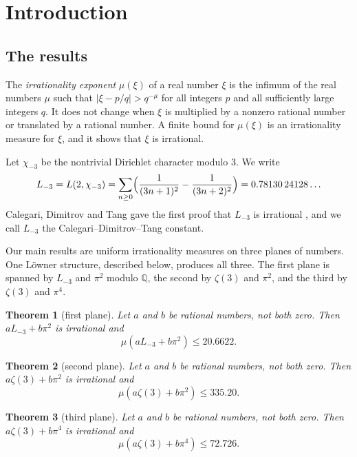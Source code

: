 \documentclass[11pt]{amsart}
\newtheorem{theorem}{Theorem}[section]
\theoremstyle{definition}
\theoremstyle{remark}
\numberwithin{equation}{section}
\newcommand{\Q}{\mathbb Q}
\newcommand{\Lt}{L_{-3}}             %
\newcommand{\MuPlaneA}{20.6622}
\newcommand{\MuPlaneB}{335.20}
\newcommand{\MuPlaneC}{72.726}
\begin{document}
\maketitle
\tableofcontents

\section{Introduction}\label{sec:intro}

\subsection{The results}
The \emph{irrationality exponent} $\mu(\xi)$ of a real number $\xi$ is the infimum of the real numbers $\mu$ such that
$|\xi-p/q|>q^{-\mu}$ for all integers $p$ and all sufficiently large integers $q$. It does not change when $\xi$ is multiplied by a nonzero rational number or translated by a rational
number. A finite bound for $\mu(\xi)$ is an irrationality measure for $\xi$, and it shows that $\xi$ is irrational.

Let $\chi_{-3}$ be the nontrivial Dirichlet character modulo $3$. We write
\[
 \Lt=L(2,\chi_{-3})=\sum_{n\ge0}\Bigl(\frac1{(3n+1)^2}-\frac1{(3n+2)^2}\Bigr)=0.78130\,24128\ldots
\]
Calegari, Dimitrov and Tang gave the first proof that $\Lt$ is irrational \cite{CDT2024}, and we call $\Lt$ the
Calegari--Dimitrov--Tang constant.

Our main results are uniform irrationality measures on three planes of numbers. One L\"owner structure, described
below, produces all three. The first plane is spanned by $\Lt$ and $\pi^2$ modulo $\Q$, the second by $\zeta(3)$ and
$\pi^2$, and the third by $\zeta(3)$ and $\pi^4$.

\begin{theorem}[first plane]\label{thm:plane1}
Let $a$ and $b$ be rational numbers, not both zero. Then $a\Lt+b\pi^2$ is irrational and
\[
 \mu(a\Lt+b\pi^2)\le\MuPlaneA .
\]
\end{theorem}

\begin{theorem}[second plane]\label{thm:plane2}
Let $a$ and $b$ be rational numbers, not both zero. Then $a\zeta(3)+b\pi^2$ is irrational and
\[
 \mu(a\zeta(3)+b\pi^2)\le\MuPlaneB .
\]
\end{theorem}

\begin{theorem}[third plane]\label{thm:plane3}
Let $a$ and $b$ be rational numbers, not both zero. Then $a\zeta(3)+b\pi^4$ is irrational and
\[
 \mu(a\zeta(3)+b\pi^4)\le\MuPlaneC .
\]
\end{theorem}
\end{document}
